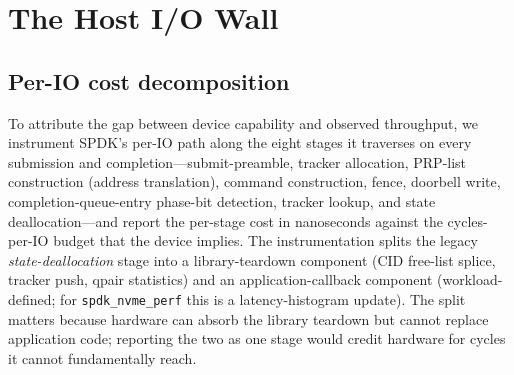 \documentclass[journal]{IEEEtran}
\begin{document}
%
%
%
\section{The Host I/O Wall}
\label{sec:wall}

\subsection{Per-IO cost decomposition}
\label{sec:wall:decomp}

To attribute the gap between device capability and observed throughput, we
instrument SPDK's per-IO path along the eight stages it traverses on every
submission and completion---submit-preamble, tracker allocation, PRP-list
construction (address translation), command construction, fence, doorbell
write, completion-queue-entry phase-bit detection, tracker lookup, and
state deallocation---and report the per-stage cost in nanoseconds against
the cycles-per-IO budget that the device implies. The instrumentation
splits the legacy \emph{state-deallocation} stage into a library-teardown
component (CID free-list splice, tracker push, qpair statistics) and an
application-callback component (workload-defined; for \texttt{spdk\_nvme\_perf}
this is a latency-histogram update). The split matters because hardware
can absorb the library teardown but cannot replace application code;
reporting the two as one stage would credit hardware for cycles it cannot
fundamentally reach.
\end{document}
